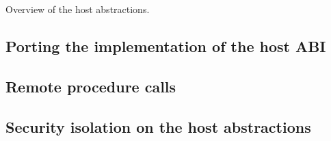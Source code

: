 \begin{table*}[t]
\centering

\caption{Overview of the \graphene{} host abstractions.}
\label{tab:overview:host-abi}
\end{table*}



\subsection{Porting the implementation of the host ABI}
\label{sec:overview:host:port}


\subsection{Remote procedure calls}
\label{sec:overview:host:rpc}


\subsection{Security isolation on the host abstractions}
\label{sec:overview:host:security}




